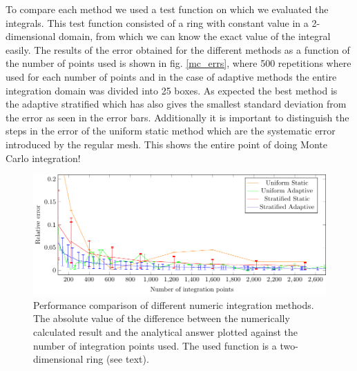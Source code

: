 To compare each method we used a test function on which we evaluated the integrals.
This test function consisted of a ring with constant value in a 2-dimensional domain, from which
we can know the exact value of the integral easily. The results
of the error obtained for the different methods as a function of the number of points used is shown in fig. \ref{mc_errs},
 where 500 repetitions where used for each number of points and in the case of adaptive methods the entire integration
 domain was divided into 25 boxes. As
expected the best method is the adaptive stratified which has also gives the smallest standard deviation from the error as seen in the error bars.
Additionally it is important to distinguish the steps in the error of the uniform static
method which are the systematic error introduced by the regular mesh. This shows the entire point of doing Monte Carlo integration!
\begin{figure}[ht]
  \begin{center}
  \includegraphics[scale=1 ]{graphs/integration_test_ring.pdf}
  \caption{Performance comparison of different numeric integration methods. The absolute value of the difference between the numerically calculated result and the analytical answer plotted against the number of integration points used. The used function is a two-dimensional ring (see text).}
  \label{fig:int}
  \end{center}
\end{figure}
